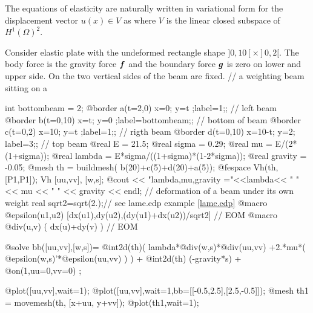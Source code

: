\documentclass[a4paper,twoside,12pt]{book}
\def\vec#1{\mbox{\boldmath $#1$}}
\begin{document}
The equations of elasticity are naturally written in variational form
for the displacement vector $u(x)\in V$ as
\Blue{$$
\int_\Omega [2\mu\epsilon_{ij}(\vec u)\epsilon_{ij}(\vec v)
+\lambda \epsilon_{ii}(\vec{u})\epsilon_{jj}(\vec v)]
=\int_\Omega \vec f\cdot \vec v +\int_\Gamma \vec g\cdot \vec v,%
\forall \vec v\in V
$$}
where $V$ is the linear closed subspace of $H^1(\Omega)^2$.

\begin{example}
Consider  elastic plate with the undeformed rectangle shape
$]0,10[\times ]0,2[$.
The body force is the gravity force $\vec f$ and the
boundary force $\vec g$ is zero on lower and upper side.
On the two vertical sides of the beam are fixed.
\bFF
//   a weighting beam sitting on a

int bottombeam = 2;
@border a(t=2,0)  { x=0; y=t ;label=1;};        //  left beam
@border b(t=0,10) { x=t; y=0 ;label=bottombeam;};        //  bottom of beam
@border c(t=0,2)  { x=10; y=t ;label=1;};       //  rigth beam
@border d(t=0,10) { x=10-t; y=2; label=3;};     //  top beam
@real E = 21.5;
@real sigma = 0.29;
@real mu = E/(2*(1+sigma));
@real lambda = E*sigma/((1+sigma)*(1-2*sigma));
@real gravity = -0.05;
@mesh th = buildmesh( b(20)+c(5)+d(20)+a(5));
@fespace Vh(th,[P1,P1]);
Vh [uu,vv], [w,s];
@cout << "lambda,mu,gravity ="<<lambda<< " " << mu << " " << gravity << endl;
// deformation of a beam under its own weight
real sqrt2=sqrt(2.);// see lame.edp example \ref{lame.edp}
@macro @epsilon(u1,u2)  [dx(u1),dy(u2),(dy(u1)+dx(u2))/sqrt2] // EOM
@macro @div(u,v) ( dx(u)+dy(v) ) // EOM

@solve bb([uu,vv],[w,s])=
        @int2d(th)(
                  lambda*@div(w,s)*@div(uu,vv)
                  +2.*mu*( @epsilon(w,s)'*@epsilon(uu,vv) )
                 )
  + @int2d(th) (-gravity*s)
  + @on(1,uu=0,vv=0)
 ;

@plot([uu,vv],wait=1);
@plot([uu,vv],wait=1,bb=[[-0.5,2.5],[2.5,-0.5]]);
@mesh th1 = movemesh(th, [x+uu, y+vv]);
@plot(th1,wait=1);
\eFF
\end{example}
\end{document}
